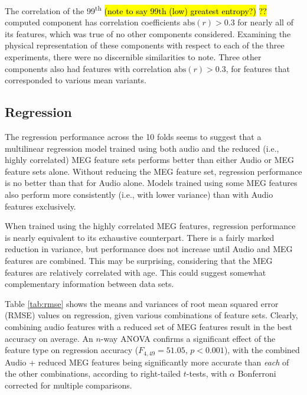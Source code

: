 \documentclass[a4paper]{article}
\newcommand{\FR}[1]{{\small \textcolor{red}{\hl{#1}}}}
\newcommand{\DK}[1]{{\small \textcolor{blue}{\hl{#1}}}}
\begin{document}
The correlation of the 99\textsuperscript{th} \DK{(note to say 99th (low) greatest entropy?)} \FR{??} computed component has correlation coefficients $\text{abs}(r)>0.3$ for nearly all of its features, which was true of no other components considered. Examining the physical representation of these components with respect to each of the three experiments, there were no discernible similarities to note. Three other components also had features with correlation $\text{abs}(r)>0.3$, for features that corresponded to various mean variants.

\subsection{Regression}

The regression performance across the 10 folds seems to suggest that a multilinear regression model trained using both audio and the reduced (i.e., highly correlated) MEG feature sets performs better than either Audio or MEG feature sets alone. Without  reducing the MEG feature set, regression performance is no better than that for Audio alone. Models trained using some MEG features also  perform more consistently (i.e., with lower variance) than with Audio features exclusively.

When trained using the highly correlated MEG features, regression performance is nearly equivalent to its exhaustive counterpart. There is a fairly marked reduction in variance, but performance does not increase until Audio and MEG features are combined. This may be surprising, considering that the MEG features are relatively correlated with age. This could suggest somewhat complementary information between data sets. %

Table \ref{tab:rmse} shows the means and variances of root mean squared error (RMSE) values on regression, given various combinations of feature sets. Clearly, combining audio features with a reduced set of MEG features result in the best accuracy on average. An $n$-way ANOVA confirms a significant effect of the feature type on regression accuracy ($F_{4,49} = 51.05$, $p<0.001$), with the combined Audio + reduced MEG features being significantly more accurate than {\em each} of the other combinations, according to right-tailed $t$-tests, with $\alpha$ Bonferroni corrected for multiple comparisons.
\end{document}

